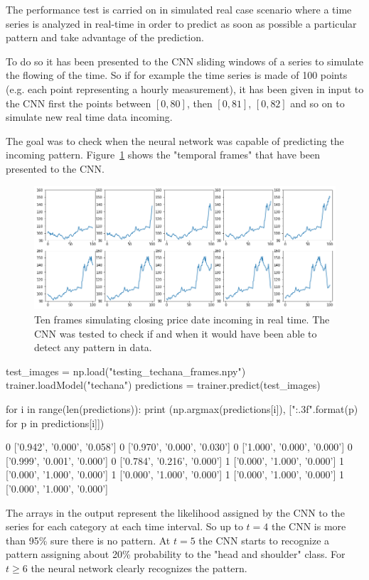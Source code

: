 The performance test is carried on in simulated real case scenario where a time series is analyzed in real-time in order to predict as soon as possible a particular pattern and take advantage of the prediction.

To do so it has been presented to the CNN sliding windows of a series to simulate the flowing of the time. So if for example the time series is   made of 100 points (e.g. each point representing a hourly measurement), it has been given in input to the CNN first the points between \([0, 80]\), then \([0, 81]\), \([0, 82]\) and so on to simulate new real time data incoming. 

The goal was to check when the neural network was capable of predicting the incoming pattern. Figure~\ref{fig:frame_simulation} shows the "temporal frames" that have been presented to the CNN.

\begin{figure}
	\centering
	\includegraphics[width=\textwidth]{figures/tech_ana_frames.png}
	\caption{Ten frames simulating closing price date incoming in real time. The CNN was tested to check if and when it would have been able to detect any pattern in data.}
	\label{fig:frame_simulation}
\end{figure}

\begin{ipython}
test_images = np.load("testing_techana_frames.npy")
trainer.loadModel("techana")
predictions = trainer.predict(test_images)

for i in range(len(predictions)):
    print (np.argmax(predictions[i]), ["{:.3f}".format(p) for p in predictions[i]])
\end{ipython}
\begin{ioutput}
0 ['0.942', '0.000', '0.058']
0 ['0.970', '0.000', '0.030']
0 ['1.000', '0.000', '0.000']
0 ['0.999', '0.001', '0.000']
0 ['0.784', '0.216', '0.000']
1 ['0.000', '1.000', '0.000']
1 ['0.000', '1.000', '0.000']
1 ['0.000', '1.000', '0.000']
1 ['0.000', '1.000', '0.000']
1 ['0.000', '1.000', '0.000']
\end{ioutput}
\noindent
The arrays in the output represent the likelihood assigned by the CNN to the series for each category at each time interval. So up to $t=4$ the CNN is more than 95\% sure there is no pattern. 
At $t=5$ the CNN starts to recognize a pattern assigning about 20\% probability to the "head and shoulder" class. For $t\geq 6$ the neural network clearly recognizes the pattern.
	

